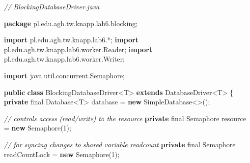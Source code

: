 \documentclass[11pt]{article}
\newenvironment{Shaded}{}{}
\newcommand{\KeywordTok}[1]{\textcolor[rgb]{0.00,0.44,0.13}{\textbf{{#1}}}}
\newcommand{\DataTypeTok}[1]{\textcolor[rgb]{0.56,0.13,0.00}{{#1}}}
\newcommand{\DecValTok}[1]{\textcolor[rgb]{0.25,0.63,0.44}{{#1}}}
\newcommand{\CommentTok}[1]{\textcolor[rgb]{0.38,0.63,0.69}{\textit{{#1}}}}
\newcommand{\NormalTok}[1]{{#1}}
\newcommand{\ImportTok}[1]{{#1}}
\newcommand{\OperatorTok}[1]{\textcolor[rgb]{0.40,0.40,0.40}{{#1}}}
\newcommand{\BuiltInTok}[1]{{#1}}
\begin{document}
\begin{Shaded}
\begin{Highlighting}[]
\CommentTok{// BlockingDatabaseDriver.java}

\KeywordTok{package}\ImportTok{ pl}\OperatorTok{.}\ImportTok{edu}\OperatorTok{.}\ImportTok{agh}\OperatorTok{.}\ImportTok{tw}\OperatorTok{.}\ImportTok{knapp}\OperatorTok{.}\ImportTok{lab6}\OperatorTok{.}\ImportTok{blocking}\OperatorTok{;}

\KeywordTok{import} \ImportTok{pl}\OperatorTok{.}\ImportTok{edu}\OperatorTok{.}\ImportTok{agh}\OperatorTok{.}\ImportTok{tw}\OperatorTok{.}\ImportTok{knapp}\OperatorTok{.}\ImportTok{lab6}\OperatorTok{.*;}
\KeywordTok{import} \ImportTok{pl}\OperatorTok{.}\ImportTok{edu}\OperatorTok{.}\ImportTok{agh}\OperatorTok{.}\ImportTok{tw}\OperatorTok{.}\ImportTok{knapp}\OperatorTok{.}\ImportTok{lab6}\OperatorTok{.}\ImportTok{worker}\OperatorTok{.}\ImportTok{Reader}\OperatorTok{;}
\KeywordTok{import} \ImportTok{pl}\OperatorTok{.}\ImportTok{edu}\OperatorTok{.}\ImportTok{agh}\OperatorTok{.}\ImportTok{tw}\OperatorTok{.}\ImportTok{knapp}\OperatorTok{.}\ImportTok{lab6}\OperatorTok{.}\ImportTok{worker}\OperatorTok{.}\ImportTok{Writer}\OperatorTok{;}

\KeywordTok{import} \ImportTok{java}\OperatorTok{.}\ImportTok{util}\OperatorTok{.}\ImportTok{concurrent}\OperatorTok{.}\ImportTok{Semaphore}\OperatorTok{;}

\KeywordTok{public} \KeywordTok{class}\NormalTok{ BlockingDatabaseDriver}\OperatorTok{\textless{}}\NormalTok{T}\OperatorTok{\textgreater{}} \KeywordTok{extends}\NormalTok{ DatabaseDriver}\OperatorTok{\textless{}}\NormalTok{T}\OperatorTok{\textgreater{}} \OperatorTok{\{}
    \KeywordTok{private} \DataTypeTok{final}\NormalTok{ Database}\OperatorTok{\textless{}}\NormalTok{T}\OperatorTok{\textgreater{}}\NormalTok{ database }\OperatorTok{=} \KeywordTok{new}\NormalTok{ SimpleDatabase}\OperatorTok{\textless{}\textgreater{}();}

    \CommentTok{// controls access (read/write) to the resource}
    \KeywordTok{private} \DataTypeTok{final} \BuiltInTok{Semaphore}\NormalTok{ resource }\OperatorTok{=} \KeywordTok{new} \BuiltInTok{Semaphore}\OperatorTok{(}\DecValTok{1}\OperatorTok{);}

    \CommentTok{// for syncing changes to shared variable readcount}
    \KeywordTok{private} \DataTypeTok{final} \BuiltInTok{Semaphore}\NormalTok{ readCountLock }\OperatorTok{=} \KeywordTok{new} \BuiltInTok{Semaphore}\OperatorTok{(}\DecValTok{1}\OperatorTok{);}


\end{Highlighting}
\end{Shaded}
\end{document}
